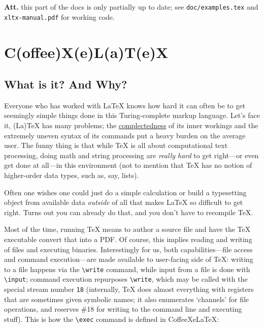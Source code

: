 \textbf{Att.} this part of the docs is only partially up to date; see
\texttt{doc/examples.tex} and \texttt{xltx-manual.pdf} for working code.

\section{C(offee)X(e)L(a)T(e)X}\label{coffeexelatex}

\subsection{What is it? And Why?}\label{what-is-it-and-why}

Everyone who has worked with LaTeX knows how hard it can often be to get
seemingly simple things done in this Turing-complete markup language.
Let's face it, (La)TeX has many problems; the
\href{http://www.infoq.com/presentations/Simple-Made-Easy}{complectedness}
of its inner workings and the extremely uneven syntax of its commands
put a heavy burden on the average user. The funny thing is that while
TeX is all about computational text processing, doing math and string
processing are \emph{really hard} to get right---or even get done at
all---in this environment (not to mention that TeX has no notion of
higher-order data types, such as, say, lists).

Often one wishes one could just do a simple calculation or build a
typesetting object from available data \emph{outside} of all that makes
LaTeX so difficult to get right. Turns out you can already do that, and
you don't have to recompile TeX.

Most of the time, running TeX means to author a source file and have the
TeX executable convert that into a PDF. Of course, this implies reading
and writing of files and executing binaries. Interestingly for us, both
capabilities---file access and command execution---are made available to
user-facing side of TeX: writing to a file happens via the
\texttt{\textbackslash{}write} command, while input from a file is done
with \texttt{\textbackslash{}input}; command execution repurposes
\texttt{\textbackslash{}write}, which may be called with the special
stream number \texttt{18} (internally, TeX does almost everything with
registers that are sometimes given symbolic names; it also enumerates
`channels' for file operations, and reserves \#18 for writing to the
command line and executing stuff). This is how the
\texttt{\textbackslash{}exec} command is defined in CoffeeXeLaTeX:

